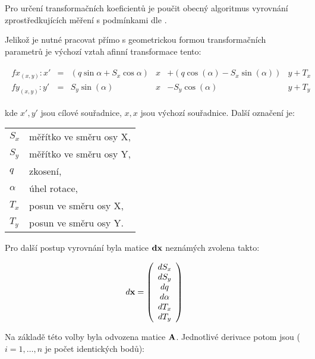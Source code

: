 Pro určení transformačních koeficientů je poučit  obecný algoritmus vyrovnání
zprostředkujících měření s podmínkami dle \cite{vyrovnani}.

Jelikož je nutné pracovat přímo s geometrickou formou transformačních parametrů
je výchozí vztah afinní transformace tento:

\begin{eqnarray}
\begin{array}{ccccccc}
\label{afinni}
fx_{(x,y)}: x'&=& (q  \sin{\alpha} + S_{x} \cos{\alpha})&x& + (q  
\cos{(\alpha)} - S_{x}\sin{(\alpha)})&y + T_x\\
fy_{(x,y)}: y'&=&S_{y} \sin{(\alpha)}&x& - S_{y}\cos{(\alpha)}&y + T_y
\end{array}
\end{eqnarray}

kde $x', y'$ jsou cílové souřadnice, $x, x$ jsou výchozí souřadnice. Další
označení je:

\begin{table}[h]
\centering

\begin{tabular}{ll}
$S_{x}$  & měřítko ve směru osy X, \\
$S_{y}$  & měřítko ve směru osy Y, \\
$q$     & zkosení, \\
$\alpha$ & úhel rotace, \\
$T_{x}$  & posun ve směru osy X, \\
$T_{y}$  & posun ve směru osy Y. \\
\end{tabular}
\end{table}

Pro další postup vyrovnání byla matice $\bf{dx}$ neznámých zvolena takto:


\begin{eqnarray} \label{dxafinni}
d {\bf x} = \left(
\begin{array}{c}
dS_{x} \\
dS_{y} \\
dq \\
d\alpha \\
dT_{x} \\
dT_{y}
\end{array}
\right) 
\end{eqnarray}

Na základě této volby byla odvozena matice $\bf A$.  Jednotlivé derivace  potom
jsou ($i = 1, \ldots, n$ je počet identických bodů):

